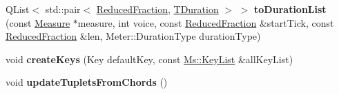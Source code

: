 \begin{DoxyCompactItemize}
\item 
\mbox{\label{class_ms_1_1_m_track_afb6c1c7caed45a4da11f6327a5fdc03c}} 
Q\+List$<$ std\+::pair$<$ \hyperlink{class_ms_1_1_reduced_fraction}{Reduced\+Fraction}, \hyperlink{class_ms_1_1_t_duration}{T\+Duration} $>$ $>$ {\bfseries to\+Duration\+List} (const \hyperlink{class_ms_1_1_measure}{Measure} $\ast$measure, int voice, const \hyperlink{class_ms_1_1_reduced_fraction}{Reduced\+Fraction} \&start\+Tick, const \hyperlink{class_ms_1_1_reduced_fraction}{Reduced\+Fraction} \&len, Meter\+::\+Duration\+Type duration\+Type)
\item 
\mbox{\label{class_ms_1_1_m_track_ac340830bfb1526dac9d6806150b75724}} 
void {\bfseries create\+Keys} (Key default\+Key, const \hyperlink{class_ms_1_1_key_list}{Ms\+::\+Key\+List} \&all\+Key\+List)
\item 
\mbox{\label{class_ms_1_1_m_track_a20a533aebe7674a23594344af848dc28}} 
void {\bfseries update\+Tuplets\+From\+Chords} ()
\end{DoxyCompactItemize}
